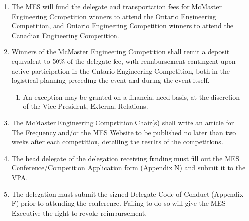 \begin{enumerate}
  \begin{enumerate}
   \item
    The MES will fund the delegate and transportation fees for McMaster Engineering Competition winners to attend the Ontario Engineering Competition, and Ontario Engineering Competition winners to attend the Canadian Engineering Competition.
   \item
    Winners of the McMaster Engineering Competition shall remit a deposit equivalent to 50\% of the delegate fee, with reimbursement contingent upon active participation in the Ontario Engineering Competition, both in the logistical planning preceding the event and during the event itself.
    \begin{enumerate}
     \item An exception may be granted on a financial need basis, at the discretion of the Vice President, External Relations.
    \end{enumerate}
   \item
    The McMaster Engineering Competition Chair(s) shall write an article for The Frequency and/or the MES Website to be published no later than two weeks after each competition, detailing the results of the competitions.
   \item
    The head delegate of the delegation receiving funding must fill out the MES Conference/Competition Application form (Appendix N) and submit it to the VPA.
   \item
    The delegation must submit the signed Delegate Code of Conduct (Appendix F) prior to attending the conference. Failing to do so will give the MES Executive the right to revoke reimbursement.

  \end{enumerate}
\end{enumerate}

